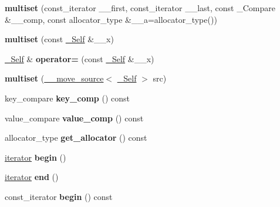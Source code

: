 \begin{DoxyCompactItemize}
{\bfseries multiset} (const\+\_\+iterator \+\_\+\+\_\+first, const\+\_\+iterator \+\_\+\+\_\+last, const \+\_\+\+Compare \&\+\_\+\+\_\+comp, const allocator\+\_\+type \&\+\_\+\+\_\+a=allocator\+\_\+type())
\item 
\mbox{\label{classmultiset_a052213836ade6ed6d176fdc6277b2af0}} 
{\bfseries multiset} (const \hyperlink{classmultiset}{\+\_\+\+Self} \&\+\_\+\+\_\+x)
\item 
\mbox{\label{classmultiset_ad0ad5ce6eddcf6382402c221379643e9}} 
\hyperlink{classmultiset}{\+\_\+\+Self} \& {\bfseries operator=} (const \hyperlink{classmultiset}{\+\_\+\+Self} \&\+\_\+\+\_\+x)
\item 
\mbox{\label{classmultiset_a61498e6098f1de558d98ab302cf2788a}} 
{\bfseries multiset} (\hyperlink{class____move__source}{\+\_\+\+\_\+move\+\_\+source}$<$ \hyperlink{classmultiset}{\+\_\+\+Self} $>$ src)
\item 
\mbox{\label{classmultiset_aba76c9cdb23cfcc191075bc6bc41242f}} 
key\+\_\+compare {\bfseries key\+\_\+comp} () const
\item 
\mbox{\label{classmultiset_af9f18c94881f97aabda6bb2e0e5b048a}} 
value\+\_\+compare {\bfseries value\+\_\+comp} () const
\item 
\mbox{\label{classmultiset_abf7da913100c6011865053a8500bf83e}} 
allocator\+\_\+type {\bfseries get\+\_\+allocator} () const
\item 
\mbox{\label{classmultiset_ab2624498502b6cfcd62522e6ebe71f66}} 
\hyperlink{structiterator}{iterator} {\bfseries begin} ()
\item 
\mbox{\label{classmultiset_a79647d6ffd840a14b58ebc24687a8535}} 
\hyperlink{structiterator}{iterator} {\bfseries end} ()
\item 
\mbox{\label{classmultiset_a68055d92eaf8f285df22794c0ca8ce25}} 
const\+\_\+iterator {\bfseries begin} () const
\item 
\mbox{\label{classmultiset_a266c097f0a3a38ec4c1f3165f9f94614}} 

\end{DoxyCompactItemize}
